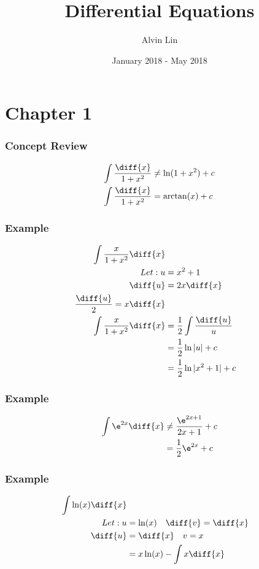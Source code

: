 \documentclass{math}
\title{Differential Equations}
\author{Alvin Lin}
\date{January 2018 - May 2018}
\begin{document}
\maketitle

\section*{Chapter 1}

\subsubsection*{Concept Review}
\begin{align*}
  \int\frac{\diff{x}}{1+x^2} &\ne \ln(1+x^2)+c \\
  \int\frac{\diff{x}}{1+x^2} &= \arctan(x)+c
\end{align*}

\subsubsection*{Example}
\begin{align*}
  \int\frac{x}{1+x^2}\diff{x} \\
  Let: u &= x^2+1 \\
  \diff{u} &= 2x\diff{x} \\
  \frac{\diff{u}}{2} = x\diff{x} \\
  \int\frac{x}{1+x^2}\diff{x} &= \frac{1}{2}\int\frac{\diff{u}}{u} \\
  &= \frac{1}{2}\ln|u|+c \\
  &= \frac{1}{2}\ln|x^2+1|+c
\end{align*}

\subsubsection*{Example}
\begin{align*}
  \int\e^{2x}\diff{x} &\ne \frac{\e^{2x+1}}{2x+1}+c \\
  &= \frac{1}{2}\e^{2x}+c
\end{align*}

\subsubsection*{Example}
\begin{align*}
  \int\ln(x)\diff{x} \\
  Let: u &= \ln(x) \quad \diff{v} = \diff{x} \\
  \diff{u} &= \diff{x} \quad v = x \\
  &= x\ln(x)-\int{x\diff{x}}
\end{align*}
\end{document}
